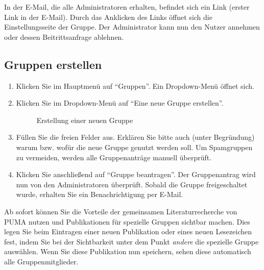 In der E-Mail, die alle Administratoren erhalten, befindet sich ein Link (erster Link in der E-Mail). Durch das Anklicken des Links öffnet sich die Einstellungsseite der Gruppe. Der Administrator kann nun den Nutzer annehmen oder dessen Beitrittsanfrage ablehnen.
\subsection{Gruppen erstellen}
\begin{enumerate}
    \item Klicken Sie im Hauptmenü auf \enquote{Gruppen}. Ein Dropdown-Menü öffnet sich.
    \item Klicken Sie im Dropdown-Menü auf \enquote{Eine neue Gruppe erstellen}.
\begin{figure}[h!]
 \centering
 \caption{Erstellung einer neuen Gruppe}
 \label{figure062}
\end{figure}
    \item Füllen Sie die freien Felder aus. Erklären Sie bitte auch (unter Begründung) warum bzw. wofür die neue Gruppe genutzt werden soll. Um Spamgruppen zu vermeiden, werden alle Gruppenanträge manuell überprüft. 
    \item Klicken Sie anschließend auf \enquote{Gruppe beantragen}. Der Gruppenantrag wird nun von den Administratoren überprüft. Sobald die Gruppe freigeschaltet wurde, erhalten Sie ein Benachrichtigung per E-Mail.
\end{enumerate}
Ab sofort können Sie die Vorteile der gemeinsamen Literaturrecherche von PUMA nutzen und Publikationen  für spezielle Gruppen sichtbar machen. Dies legen Sie beim Eintragen einer neuen Publikation oder eines neuen Lesezeichen fest, indem Sie bei der Sichtbarkeit unter dem Punkt \textit{andere} die spezielle Gruppe auswählen. Wenn Sie diese Publikation nun speichern, sehen diese automatisch alle Gruppenmitglieder.
